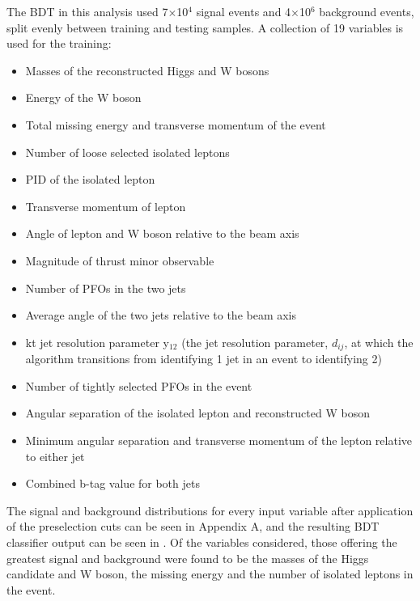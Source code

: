 The \ac{BDT} in this analysis used 7$\times$10$^4$ signal events and 4$\times$10$^6$ background events, split evenly between training and testing samples. A collection of 19 variables is used for the training:

\begin{itemize}
\item Masses of the reconstructed Higgs and W bosons
\item Energy of the W boson
\item Total missing energy and transverse momentum of the event
\item Number of loose selected isolated leptons
\item PID of the isolated lepton
\item Transverse momentum of lepton
\item Angle of lepton and W boson relative to the beam axis
\item Magnitude of thrust minor observable
\item Number of \ac{PFO}s in the two jets
\item Average angle of the two jets relative to the beam axis
\item kt jet resolution parameter y$_{12}$ (the jet resolution parameter, $d_{ij}$, at which the algorithm transitions from identifying 1 jet in an event to identifying 2)
\item Number of tightly selected PFOs in the event
\item Angular separation of the isolated lepton and reconstructed W boson
\item Minimum angular separation and transverse momentum of the lepton relative to either jet
\item Combined b-tag value for both jets
\end{itemize}

The signal and background distributions for every input variable after application of the preselection cuts can be seen in Appendix A, and the resulting BDT classifier output can be seen in . Of the variables considered, those offering the greatest signal and background were found to be the masses of the Higgs candidate and W boson, the missing energy and the number of isolated leptons in the event.

